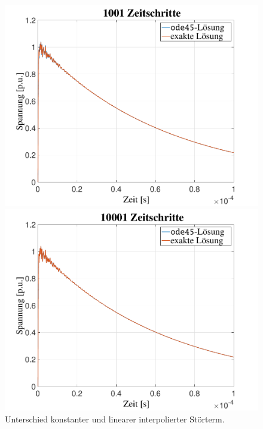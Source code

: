 \begin{refsection}
\begin{figure}
\begin{minipage}{.32\textwidth}
	        \includegraphics[width=\linewidth]{./Trafo/images/Interp1001.pdf}
	    \end{minipage}
	    \begin{minipage}{.32\textwidth}
	        \centering
	        \includegraphics[width=\linewidth]{./Trafo/images/Interp10001.pdf}
	    \end{minipage}
	    \caption{Unterschied konstanter und linearer interpolierter Störterm.}
	\end{figure}


\end{refsection}
